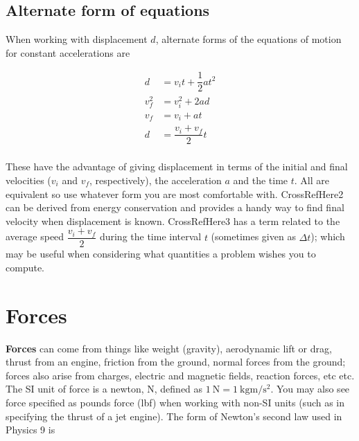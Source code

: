 \documentclass{tufte-handout}
\begin{document}
\hypertarget{alternate-form-of-equations}{%
\subsection{Alternate form of
equations}\label{alternate-form-of-equations}}

When working with
displacement \(d\), alternate forms of the equations of motion for constant
accelerations
are

\begin{align}
d &= v_i t + \dfrac{1}{2} a t^2 \\
v_f^2 &= v_i^2 + 2 a d \\
v_f &= v_i + a t \\
d &= \dfrac{v_i+v_f}{2} t \\
\end{align}

These have the advantage of giving displacement in terms of the initial
and final velocities (\(v_i\) and \(v_f\), respectively), the
acceleration \(a\) and the time \(t\). All are equivalent so use
whatever form you are most comfortable with. CrossRefHere2 can be
derived from energy conservation and provides a handy way to find final
velocity when displacement is known. CrossRefHere3 has a term related to
the average speed \(\dfrac{v_i+v_f}{2}\) during the time interval \(t\)
(sometimes given as \(\Delta t\)); which may be useful when considering
what quantities a problem wishes you to compute.

\hypertarget{forces}{%
\section{Forces}\label{forces}}

\textbf{Forces} can come from things like weight
(gravity), aerodynamic lift or drag, thrust from an engine, friction from the
ground, normal forces from the ground; forces also arise from charges,
electric and magnetic fields, reaction forces, etc etc. The SI unit of
force is a newton, \unit{\newton}, defined as
\(\qty{1}{\newton}=\qty{1}{\kilo\gram\meter\per\second\squared}\). You
may also see force specified as pounds force (lbf) when working with
non-SI units (such as in specifying the thrust of a jet engine). The
form of Newton's second law used in Physics 9 is
\end{document}
